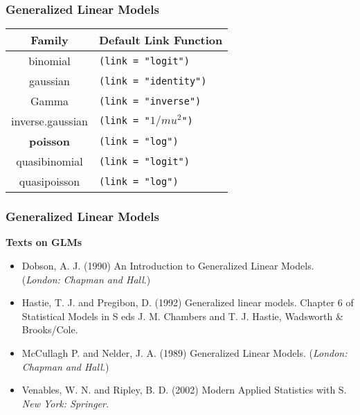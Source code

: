 \documentclass[MASTER.tex]{subfiles}
\begin{document}
\begin{frame}[fragile]
	\frametitle{Generalized Linear Models}
	\Large
\begin{center}
\begin{tabular}{|c|l|} \hline
	Family &	Default Link Function \\ \hline \hline 
	binomial&	\texttt{(link = "logit")} \\ \hline
	gaussian&	\texttt{(link = "identity")} \\ \hline
	Gamma&	\texttt{(link = "inverse")} \\ \hline
	inverse.gaussian&	\texttt{(link = "$1/mu^2$")} \\ \hline
	\textbf{poisson}	&\texttt{(link = "log")} \\ \hline
	quasibinomial&	\texttt{(link = "logit")} \\ \hline
	quasipoisson&	\texttt{(link = "log")} \\ \hline
	
\end{tabular}
\end{center}
\end{frame}
\begin{frame}
\frametitle{Generalized Linear Models}
	\large
	\textbf{Texts on GLMs}\\ \bigskip
\begin{itemize}
\item Dobson, A. J. (1990) An Introduction to Generalized Linear Models. (\textit{London: Chapman and Hall}.)
\bigskip
\item Hastie, T. J. and Pregibon, D. (1992) Generalized linear models. Chapter 6 of Statistical Models in S eds J. M. Chambers and T. J. Hastie, Wadsworth \& Brooks/Cole.
\bigskip
\item McCullagh P. and Nelder, J. A. (1989) Generalized Linear Models. (\textit{London: Chapman and Hall.})
\bigskip
\item Venables, W. N. and Ripley, B. D. (2002) Modern Applied Statistics with S. \textit{New York: Springer.}
\end{itemize}

\end{frame}
\end{document}
